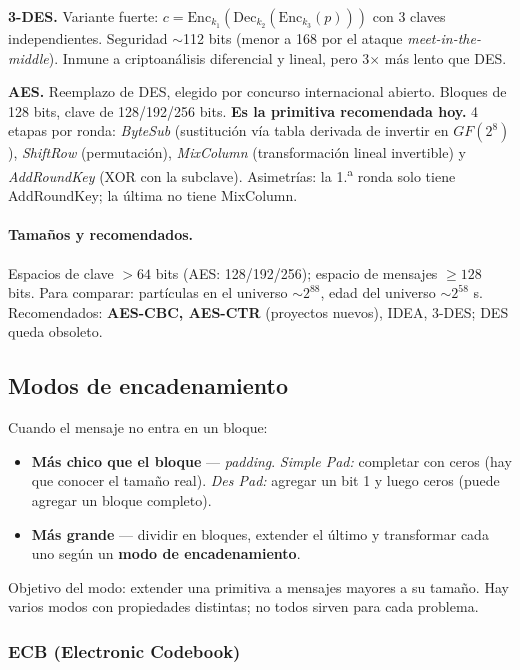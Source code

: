 \documentclass[../main.tex]{subfiles}
\begin{document}
\textbf{3-DES.} Variante fuerte: $c = \text{Enc}_{k_1}(\text{Dec}_{k_2}(\text{Enc}_{k_3}(p)))$
con 3 claves independientes. Seguridad $\sim$112 bits (menor a 168 por el
ataque \emph{meet-in-the-middle}). Inmune a criptoanálisis diferencial y
lineal, pero 3$\times$ más lento que DES.

\textbf{AES.} Reemplazo de DES, elegido por concurso internacional abierto.
Bloques de 128 bits, clave de 128/192/256 bits. \textbf{Es la primitiva
recomendada hoy.} 4 etapas por ronda: \emph{ByteSub} (sustitución vía tabla
derivada de invertir en $GF(2^8)$), \emph{ShiftRow} (permutación),
\emph{MixColumn} (transformación lineal invertible) y \emph{AddRoundKey} (XOR
con la subclave). Asimetrías: la 1.\textsuperscript{a} ronda solo tiene
AddRoundKey; la última no tiene MixColumn.

\paragraph{Tamaños y recomendados.} Espacios de clave $>64$ bits (AES: 128/192/256);
espacio de mensajes $\ge 128$ bits. Para comparar: partículas en el universo
$\sim 2^{88}$, edad del universo $\sim 2^{58}$ s. Recomendados:
\textbf{AES-CBC, AES-CTR} (proyectos nuevos), IDEA, 3-DES; DES queda obsoleto.

\subsection{Modos de encadenamiento}

Cuando el mensaje no entra en un bloque:
\begin{itemize}[nosep]
  \item \textbf{Más chico que el bloque} — \emph{padding}. \emph{Simple Pad:}
        completar con ceros (hay que conocer el tamaño real). \emph{Des Pad:}
        agregar un bit 1 y luego ceros (puede agregar un bloque completo).
  \item \textbf{Más grande} — dividir en bloques, extender el último y
        transformar cada uno según un \textbf{modo de encadenamiento}.
\end{itemize}
Objetivo del modo: extender una primitiva a mensajes mayores a su tamaño. Hay
varios modos con propiedades distintas; no todos sirven para cada problema.

\subsubsection{ECB (Electronic Codebook)}
\end{document}
